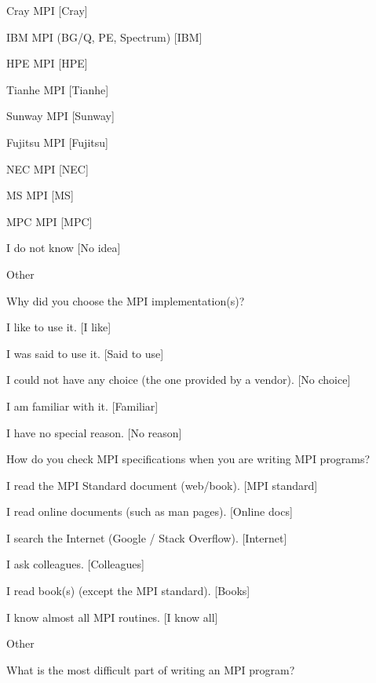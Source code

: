 \documentclass[preprint,5p,times]{elsarticle}
\begin{document}
{\begin{description}
\begin{inparaenum}[{\bf C}1)]
    \item Cray MPI [Cray]
    \item IBM MPI (BG/Q, PE, Spectrum) [IBM]
    \item HPE MPI [HPE]
    \item Tianhe MPI [Tianhe]
    \item Sunway MPI [Sunway]
    \item Fujitsu MPI [Fujitsu]
    \item NEC MPI [NEC]
    \item MS MPI [MS]
    \item MPC MPI [MPC]
    \item I do not know [No idea]
    \item Other
    \end{inparaenum}
  \item[Q13:] Why did you choose the MPI implementation(s)?
    \begin{inparaenum}[{\bf C}1)]
    \item I like to use it. [I like]
    \item I was said to use it. [Said to use]
    \item I could not have any choice (the one provided by a vendor). [No choice]
    \item I am familiar with it. [Familiar]
    \item I have no special reason. [No reason]
    \end{inparaenum}
  \item[Q14*:] How do you check MPI specifications when you are writing MPI programs?
    \begin{inparaenum}[{\bf C}1)]
    \item I read the MPI Standard document (web/book). [MPI standard]
    \item I read online documents (such as man pages). [Online docs]
    \item I search the Internet (Google / Stack Overflow). [Internet]
    \item I ask colleagues. [Colleagues]
    \item I read book(s) (except the MPI standard). [Books]
    \item I know almost all MPI routines. [I know all]
    \item Other
    \end{inparaenum}
  \item[Q15:] What is the most difficult part of writing an MPI program?
    \begin{inparaenum}[{\bf C}1)]

\end{inparaenum}
\end{description}}
\end{document}
